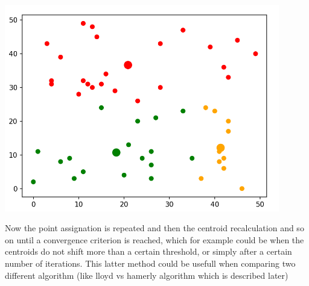 \documentclass{report}
\begin{document}
\begin{minipage}[b]{0.48\textwidth}
  \begin{center}    
      \includegraphics[width = 0.9\textwidth]{imgs/reccens.png}
      \label{fig:reccens}
  \end{center}

  Now the point assignation is repeated and then the centroid recalculation and so on  until a convergence criterion is reached, which for example could be when the centroids do not shift more than a certain threshold, or simply after a certain number of iterations. This latter method could be usefull when comparing two different algorithm (like lloyd vs hamerly algorithm which is described later)
\end{minipage}

\newpage
\end{document}
